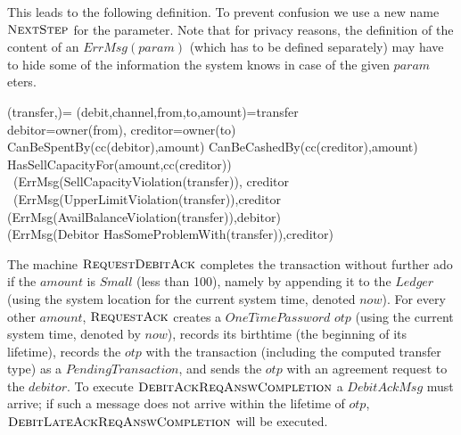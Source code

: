 This leads to the following definition. To prevent confusion we use a new name 
$\hbox{\sc NextStep}$ for the parameter. Note that for privacy reasons, the definition of the content of an $ErrMsg(param)$ (which has to be defined separately) may have to hide some of the information the system knows in case of the given $param$eters.

\begin{asm}
(transfer,)= \+
	\LET (debit,channel,from,to,amount)=transfer \\
	\LET debitor=owner(from), creditor=owner(to)\\
	\IF CanBeSpentBy(cc(debitor),amount) \THEN \+
		\IF CanBeCashedBy(cc(creditor),amount) \THEN \+
			\IF HasSellCapacityFor(amount,cc(creditor)) \THEN \+
				 \-
			\ELSE~(ErrMsg(SellCapacityViolation(transfer)), \TO creditor\-
		\ELSE~(ErrMsg(UpperLimitViolation(transfer)),\TO creditor\-
	\ELSE \+
                 (ErrMsg(AvailBalanceViolation(transfer)),\TO debitor) \\
                 (ErrMsg(Debitor HasSomeProblemWith(transfer)),\TO creditor)
\end{asm}


The machine  $\hbox{\sc RequestDebitAck}$ completes the transaction without further ado if the $amount$ is $Small$ (less than 100), namely by appending it to the $Ledger$ (using the system location for the current system time, denoted $now$). For every other $amount$, $\hbox{\sc RequestAck}$ creates a $OneTimePassword$ $otp$ (using the current system time, denoted by $now$), records its birthtime (the beginning of its lifetime), records the $otp$ with the transaction (including the computed transfer type) as a $PendingTransaction$, and sends the $otp$  with an agreement request to the $debitor$. To execute $\hbox{\sc DebitAckReqAnswCompletion}$ a $DebitAckMsg$ must arrive; if such a message does not arrive within the lifetime of $otp$, $\hbox{\sc DebitLateAckReqAnswCompletion}$ will be 
executed.

